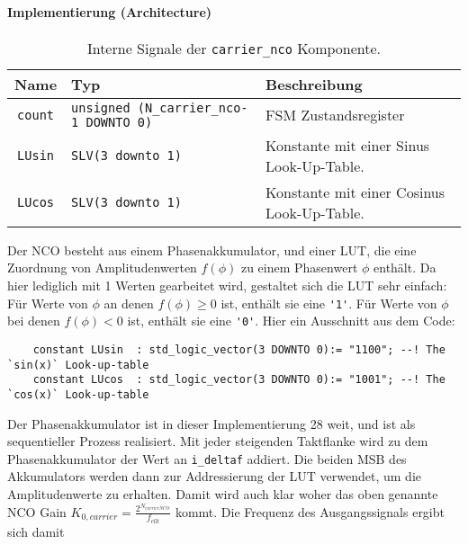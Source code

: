 \paragraph{Implementierung (Architecture)}

\begin{table}[htbp]
    \ttabbox
    {
        \caption[Carrier NCO interne Signale]{Interne Signale der \lstinline$carrier_nco$ Komponente.}
        \label{TabCarrierNCO_ArchSignals}
    }
    {
    \begin{tabular}{c  p{2cm} p{6cm}}
        \toprule
        Name      & Typ         & Beschreibung \\
        \midrule
        \lstinline$count$  & \lstinline$unsigned (N_carrier_nco-1 DOWNTO 0)$             & \gls{FSM} Zustandsregister\\
        \lstinline$LUsin$  & \lstinline$SLV(3 downto 1)$ & Konstante mit einer Sinus Look-Up-Table.\\
        \lstinline$LUcos$  & \lstinline$SLV(3 downto 1)$ & Konstante mit einer Cosinus Look-Up-Table.\\
        \bottomrule
    \end{tabular}
}
\end{table}

Der NCO besteht aus einem Phasenakkumulator, und einer \gls{LUT}, die eine Zuordnung von Amplitudenwerten $f(\phi)$ zu einem Phasenwert $\phi$ enthält. Da hier lediglich mit \SI{1}{\bit} Werten gearbeitet wird, gestaltet sich die \gls{LUT} sehr einfach: Für Werte von $\phi$ an denen $f(\phi)\geq 0$ ist, enthält sie eine \lstinline$'1'$. Für Werte von $\phi$ bei denen $f(\phi)<0$ ist, enthält sie eine \lstinline$'0'$. Hier ein Ausschnitt aus dem Code:

\begin{lstlisting}
    constant LUsin 	: std_logic_vector(3 DOWNTO 0):= "1100"; --! The `sin(x)` Look-up-table
	constant LUcos 	: std_logic_vector(3 DOWNTO 0):= "1001"; --! The `cos(x)` Look-up-table
\end{lstlisting}

Der Phasenakkumulator ist in dieser Implementierung \SI{28}{\bit} weit, und ist als sequentieller Prozess realisiert. Mit jeder steigenden Taktflanke wird zu dem Phasenakkumulator der Wert an \lstinline$i_deltaf$ addiert. Die beiden MSB des Akkumulators werden dann zur Addressierung der \gls{LUT} verwendet, um die Amplitudenwerte zu erhalten. Damit wird auch klar woher das oben genannte NCO Gain $K_{0,carrier}=\frac{2^{N_{carrierNCO}}}{f_{clk}}$ kommt.
Die Frequenz des Ausgangssignals ergibt sich damit 

